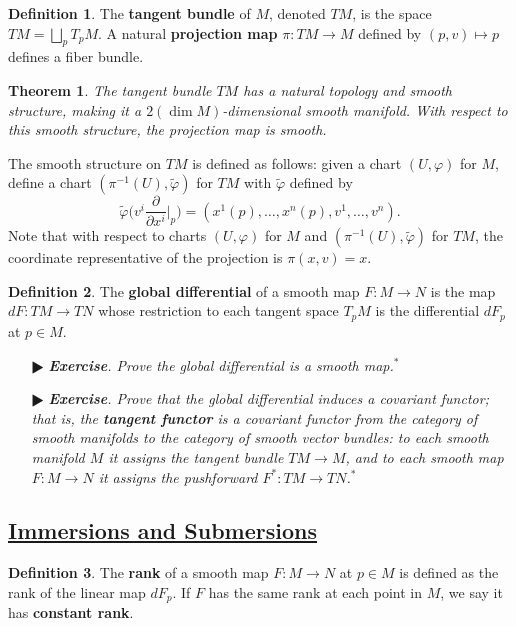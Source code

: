 \documentclass[11pt]{amsart}
\newtheorem*{theorem*}{Theorem}
\theoremstyle{definition}
\newtheorem*{definition*}{Definition}
\renewcommand\tilde{\widetilde}
\renewcommand\:{\colon}
\newcommand{\1}{\mathds{1}}
\newcommand{\exc}[1]{\vspace{-2.5pt}\begin{itemize}[leftmargin=15pt]\item[$\RHD$] \textit{\textbf{Exercise}. #1}\end{itemize}}
\begin{document}
\begin{definition*}
	The \textbf{tangent bundle} of $M$, denoted $TM$, is the space $TM = \bigsqcup_p T_pM$. A natural \textbf{projection map} $\pi\: TM \to M$ defined by $(p, v) \mapsto p$ defines a fiber bundle.
\end{definition*}

\begin{theorem*}
	The tangent bundle $TM$ has a natural topology and smooth structure, making it a $2(\dim M)$-dimensional smooth manifold. With respect to this smooth structure, the projection map is smooth.
\end{theorem*}

The smooth structure on $TM$ is defined as follows: given a chart $(U, \varphi)$ for $M$, define a chart $(\pi^{-1}(U), \tilde \varphi)$ for $TM$ with $\tilde \varphi$ defined by
	\[ \tilde \varphi \bigg( v^i \frac\partial{\partial x^i}\bigg\vert_p \bigg) = (x^1(p), \dots, x^n(p), v^1, \dots, v^n). \]
Note that with respect to charts $(U, \varphi)$ for $M$ and $(\pi^{-1}(U), \tilde \varphi)$ for $TM$, the coordinate representative of the projection is $\pi(x, v) = x$.

\begin{definition*}
	The \textbf{global differential} of a smooth map $F\: M \to N$ is the map $dF\: TM \to TN$ whose restriction to each tangent space $T_pM$ is the differential $dF_p$ at $p \in M$.
\end{definition*}

\exc{Prove the global differential is a smooth map.$^*$}
\exc{Prove that the global differential induces a covariant functor; that is, the \textbf{tangent functor} is a covariant functor from the category of smooth manifolds to the category of smooth vector bundles: to each smooth manifold $M$ it assigns the tangent bundle $TM \to M$, and to each smooth map $F\: M \to N$ it assigns the pushforward $F^*\: TM \to TN$.$^*$}

\vskip20pt




\subsection*{\underline{Immersions and Submersions}}

\begin{definition*}
	The \textbf{rank} of a smooth map $F\: M \to N$ at $p \in M$ is defined as the rank of the linear map $dF_p$. If $F$ has the same rank at each point in $M$, we say it has \textbf{constant rank}.
\end{definition*}
\end{document}
